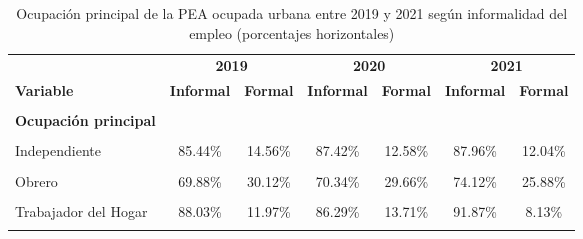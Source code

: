 \documentclass[
  letterpaper,
  12pt,
  oneside,
  spanish,
  doublespacing,
  headsepline,
  parskip]{MastersDoctoralThesis}
\begin{document}
\hypertarget{tbl-ocupi}{}
\begin{table}[H]
\caption{\label{tbl-ocupi}Ocupación principal de la PEA ocupada urbana entre 2019 y 2021 según
informalidad del empleo (porcentajes horizontales) }\tabularnewline

\centering\begingroup\fontsize{10}{12}\selectfont

\begin{tabular}{lcccccc}
\toprule
\multicolumn{1}{c}{ } & \multicolumn{2}{c}{\textbf{2019}} & \multicolumn{2}{c}{\textbf{2020}} & \multicolumn{2}{c}{\textbf{2021}} \\
\cmidrule(l{3pt}r{3pt}){2-3} \cmidrule(l{3pt}r{3pt}){4-5} \cmidrule(l{3pt}r{3pt}){6-7}
\textbf{Variable} & \textbf{Informal} & \textbf{Formal} & \textbf{Informal} & \textbf{Formal} & \textbf{Informal} & \textbf{Formal}\\
\midrule
\cellcolor{gray!6}{\textbf{Nacional}} & \cellcolor{gray!6}{66.40\%} & \cellcolor{gray!6}{33.60\%} & \cellcolor{gray!6}{68.42\%} & \cellcolor{gray!6}{31.58\%} & \cellcolor{gray!6}{71.41\%} & \cellcolor{gray!6}{28.59\%}\\
\textbf{Ocupación principal} &  &  &  &  &  & \\
\cellcolor{gray!6}{Empleador} & \cellcolor{gray!6}{45.73\%} & \cellcolor{gray!6}{54.27\%} & \cellcolor{gray!6}{47.22\%} & \cellcolor{gray!6}{52.78\%} & \cellcolor{gray!6}{50.81\%} & \cellcolor{gray!6}{49.19\%}\\
Independiente & 85.44\% & 14.56\% & 87.42\% & 12.58\% & 87.96\% & 12.04\%\\
\cellcolor{gray!6}{Empleado} & \cellcolor{gray!6}{36.68\%} & \cellcolor{gray!6}{63.32\%} & \cellcolor{gray!6}{34.02\%} & \cellcolor{gray!6}{65.98\%} & \cellcolor{gray!6}{39.84\%} & \cellcolor{gray!6}{60.16\%}\\
\addlinespace
Obrero & 69.88\% & 30.12\% & 70.34\% & 29.66\% & 74.12\% & 25.88\%\\
\cellcolor{gray!6}{Familiar No Remunerado} & \cellcolor{gray!6}{100.00\%} & \cellcolor{gray!6}{0.00\%} & \cellcolor{gray!6}{100.00\%} & \cellcolor{gray!6}{0.00\%} & \cellcolor{gray!6}{100.00\%} & \cellcolor{gray!6}{0.00\%}\\
Trabajador del Hogar & 88.03\% & 11.97\% & 86.29\% & 13.71\% & 91.87\% & 8.13\%\\
\cellcolor{gray!6}{Otro} & \cellcolor{gray!6}{100.00\%} & \cellcolor{gray!6}{0.00\%} & \cellcolor{gray!6}{100.00\%} & \cellcolor{gray!6}{0.00\%} & \cellcolor{gray!6}{100.00\%} & \cellcolor{gray!6}{0.00\%}\\
\bottomrule
\end{tabular}
\endgroup{}
\end{table}
\end{document}
